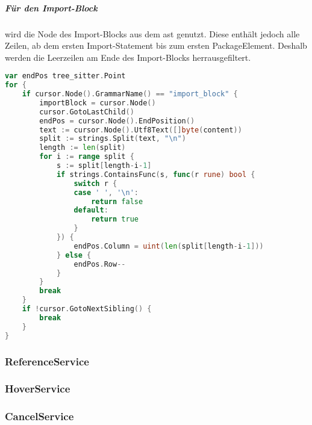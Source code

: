 \documentclass[./einleitung.tex]{subfiles}
\begin{document}
    \subparagraph{Für den Import-Block} wird die Node des Import-Blocks aus dem \acrshort{ast} genutzt.
    Diese enthält jedoch alle Zeilen, ab dem ersten Import-Statement bis zum ersten PackageElement.
    Deshalb werden die Leerzeilen am Ende des Import-Blocks herrausgefiltert.
    \begin{lstlisting}[language=Go, caption=Filterung der leeren Zeilen, label=lst:filterImportFolding]
var endPos tree_sitter.Point
for {
    if cursor.Node().GrammarName() == "import_block" {
        importBlock = cursor.Node()
        cursor.GotoLastChild()
        endPos = cursor.Node().EndPosition()
        text := cursor.Node().Utf8Text([]byte(content))
        split := strings.Split(text, "\n")
        length := len(split)
        for i := range split {
            s := split[length-i-1]
            if strings.ContainsFunc(s, func(r rune) bool {
                switch r {
                case ' ', '\n':
                    return false
                default:
                    return true
                }
            }) {
                endPos.Column = uint(len(split[length-i-1]))
            } else {
                endPos.Row--
            }
        }
        break
    }
    if !cursor.GotoNextSibling() {
        break
    }
}
    \end{lstlisting}

    \subsubsection[ReferenceService]{ReferenceService }\label{subsubsec:reference-service}
    \subsubsection[HoverService]{HoverService }\label{subsubsec:hover-service}
    \subsubsection[CancelService]{CancelService }\label{subsubsec:cancel-service}
\end{document}
